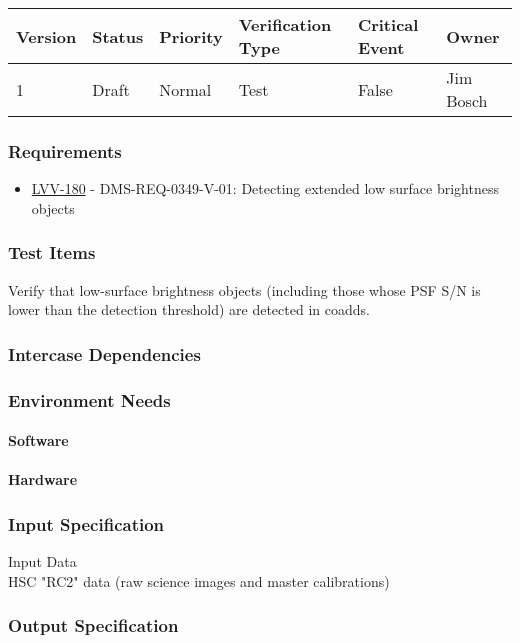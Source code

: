 \begin{longtable}[]{llllll}
\toprule
Version & Status & Priority & Verification Type & Critical Event & Owner
\\\midrule
1 & Draft & Normal &
Test & False & Jim Bosch
\\\bottomrule
\end{longtable}

\subsubsection{Requirements}
\begin{itemize}
\item \href{https://jira.lsstcorp.org/browse/LVV-180}{LVV-180} - DMS-REQ-0349-V-01: Detecting extended  low surface brightness objects
\end{itemize}

\subsubsection{Test Items}
Verify that low-surface brightness objects (including those whose PSF
S/N is lower than the detection threshold) are detected in coadds.



\subsubsection{Intercase Dependencies}

\subsubsection{Environment Needs}

\paragraph{Software}

\paragraph{Hardware}

\subsubsection{Input Specification}
Input Data\\
HSC "RC2" data (raw science images and master calibrations)


\subsubsection{Output Specification}

